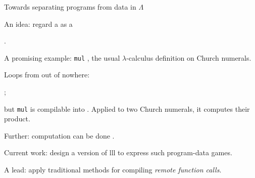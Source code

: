 \documentclass[12pt,fleqn,landscape]{article}
\begin{document}

\begin{slide}{Towards separating programs from data in $\Lambda$}


\be

\item An idea: regard a  as a

\hfill {}.
\vair

\item A promising example: {\tt mul} , the usual $\lambda$-calculus definition on Church numerals. 
\vair

\item Loops from out of nowhere:
\bi
\item {}; 
\vair

\item but  {\tt mul} is compilable into . Applied to two Church numerals, it  computes their product.
\vair

\item Further: computation can be done .
\ei
\vair

\item Current work: design a  version of {\sc lll} to express such program-data games. 
\vair

A  lead: apply traditional methods for compiling  {\em remote function calls}.

\ee






\end{slide}



\end{document}
